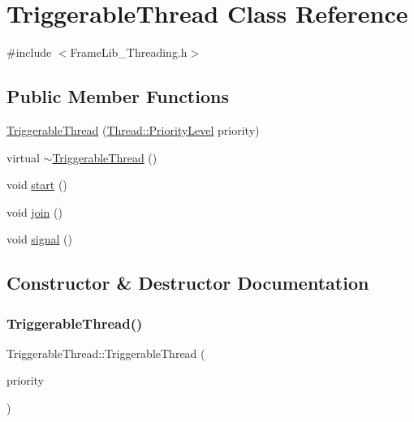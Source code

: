 \hypertarget{class_triggerable_thread}{}\section{Triggerable\+Thread Class Reference}
\label{class_triggerable_thread}


{\ttfamily \#include $<$Frame\+Lib\+\_\+\+Threading.\+h$>$}

\subsection*{Public Member Functions}
\begin{DoxyCompactItemize}
\item 
\hyperlink{class_triggerable_thread_a885e5555ad6448162889bd7999d2b7b1}{Triggerable\+Thread} (\hyperlink{class_thread_a42f854dd02a3640e422b2f3288067744}{Thread\+::\+Priority\+Level} priority)
\item 
virtual \hyperlink{class_triggerable_thread_abd45768172a989fca203f476ad2124bb}{$\sim$\+Triggerable\+Thread} ()
\item 
void \hyperlink{class_triggerable_thread_acda64886ceb38f18168d4af4c27391ed}{start} ()
\item 
void \hyperlink{class_triggerable_thread_ab0ce124fac1a131bdc27b0a757470820}{join} ()
\item 
void \hyperlink{class_triggerable_thread_a5f470639d15d37ad5a9388b39d9bbe41}{signal} ()
\end{DoxyCompactItemize}


\subsection{Constructor \& Destructor Documentation}
\mbox{\label{class_triggerable_thread_a885e5555ad6448162889bd7999d2b7b1}} 
\subsubsection{\texorpdfstring{Triggerable\+Thread()}{TriggerableThread()}}
{\footnotesize\ttfamily Triggerable\+Thread\+::\+Triggerable\+Thread (\begin{DoxyParamCaption}\item[{\hyperlink{class_thread_a42f854dd02a3640e422b2f3288067744}{Thread\+::\+Priority\+Level}}]{priority }\end{DoxyParamCaption})\hspace{0.3cm}{\ttfamily [inline]}}

